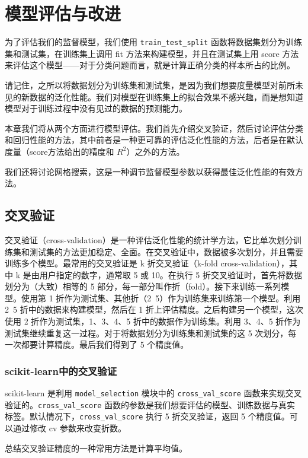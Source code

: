 \chapter{模型评估与改进}
为了评估我们的监督模型，我们使用 \verb|train_test_split| 函数将数据集划分为训练集和测试集，在训练集上调用 fit 方法来构建模型，并且在测试集上用 score 方法来评估这个模型——对于分类问题而言，就是计算正确分类的样本所占的比例。

请记住，之所以将数据划分为训练集和测试集，是因为我们想要度量模型对前所未见的新数据的泛化性能。我们对模型在训练集上的拟合效果不感兴趣，而是想知道模型对于训练过程中没有见过的数据的预测能力。

本章我们将从两个方面进行模型评估。我们首先介绍交叉验证，然后讨论评估分类和回归性能的方法，其中前者是一种更可靠的评估泛化性能的方法，后者是在默认度量（score方法给出的精度和 $R^2$）之外的方法。

我们还将讨论网格搜索，这是一种调节监督模型参数以获得最佳泛化性能的有效方法。
\section{交叉验证}
交叉验证（cross-validation）是一种评估泛化性能的统计学方法，它比单次划分训练集和测试集的方法更加稳定、全面。在交叉验证中，数据被多次划分，并且需要训练多个模型。最常用的交叉验证是 k 折交叉验证（k-fold cross-validation），其中 k 是由用户指定的数字，通常取 5 或 10。在执行 5 折交叉验证时，首先将数据划分为（大致）相等的 5 部分，每一部分叫作折（fold）。接下来训练一系列模型。使用第 1 折作为测试集、其他折（2~5）作为训练集来训练第一个模型。利用 2~5 折中的数据来构建模型，然后在 1 折上评估精度。之后构建另一个模型，这次使用 2 折作为测试集，1、3、4、5 折中的数据作为训练集。利用 3、4、5 折作为测试集继续重复这一过程。对于将数据划分为训练集和测试集的这 5 次划分，每一次都要计算精度。最后我们得到了 5 个精度值。
\subsection{scikit-learn中的交叉验证}
scikit-learn 是利用 \verb|model_selection| 模块中的 \verb|cross_val_score| 函数来实现交叉验证的。\verb|cross_val_score| 函数的参数是我们想要评估的模型、训练数据与真实标签。默认情况下，\verb|cross_val_score| 执行 5 折交叉验证，返回 5 个精度值。可以通过修改 cv 参数来改变折数。

总结交叉验证精度的一种常用方法是计算平均值。

